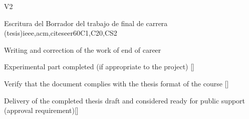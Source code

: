 \begin{syllabus}
\begin{competences}{V2}
\item {} 
\item {}
\item {}
\end{competences}

\begin{unit}{Escritura del Borrador del trabajo de final de carrera (tesis)}{}{ieee,acm,citeseer}{60}{C1,C20,CS2}
\begin{topics}
    \item Writing and correction of the work of end of career
\end{topics}

\begin{learningoutcomes}
    \item Experimental part completed (if appropriate to the project) [\Assessment]
    \item Verify that the document complies with the thesis format of the course [\Assessment]
    \item Delivery of the completed thesis draft and considered ready for public support (approval requirement)[\Assessment]
\end{learningoutcomes}
\end{unit}

\begin{coursebibliography}
\end{coursebibliography}
\end{syllabus}
